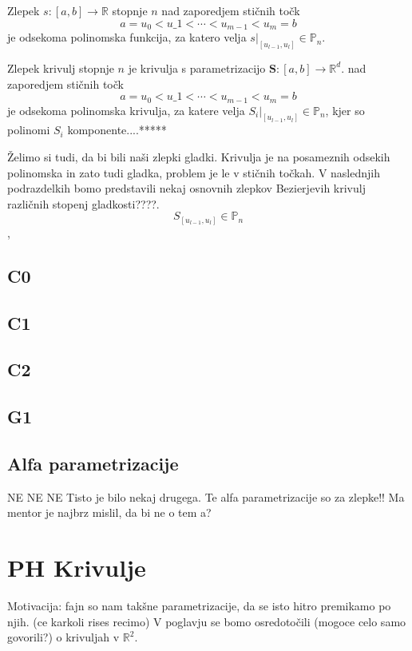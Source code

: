 \documentclass[isrm2, tisk]{fmfdelo}
\newcommand{\R}{\mathbb R}
\newcommand{\Pn}{\mathbb P_n}
\begin{document}
    \begin{definicija}
        Zlepek $s:[a,b]\to \R $  stopnje $n$ nad zaporedjem stičnih točk \[a=u_0 < u\_1 < \cdots < u_{m-1} < u_m = b\]
        je odsekoma polinomska funkcija, za katero velja $s|_{[u_{l-1},u_l]} \in \Pn$.
    \end{definicija}

    \begin{definicija}
        Zlepek krivulj stopnje $n$ je krivulja s parametrizacijo $\mathbf{S}:[a,b]\to \R^d$.
        nad zaporedjem stičnih točk \[a=u_0 < u\_1 < \cdots < u_{m-1} < u_m = b\]
        je odsekoma polinomska krivulja, za katere velja $S_i|_{[u_{l-1},u_l]} \in \Pn$, kjer so polinomi $S_i$ komponente....*****
    \end{definicija}

    Želimo si tudi, da bi bili naši zlepki gladki.
    Krivulja je na posameznih odsekih polinomska in zato tudi gladka, problem je le v stičnih točkah.
    V naslednjih podrazdelkih bomo predstavili nekaj osnovnih zlepkov Bezierjevih krivulj različnih stopenj gladkosti????.
    $$S_{[u_{l-1},u_l]} \in \Pn$$,

    \subsection{C0}

    \subsection{C1}

    \subsection{C2}

    \subsection{G1}

    \subsection{Alfa parametrizacije}
    NE
    NE
    NE
    Tisto je bilo nekaj drugega. Te alfa parametrizacije so za zlepke!! Ma mentor je najbrz mislil, da bi ne o tem a?


    \section{PH Krivulje}
    Motivacija: fajn so nam takšne parametrizacije, da se isto hitro premikamo po njih. (ce karkoli rises recimo)
    V poglavju se bomo osredotočili (mogoce celo samo govorili?) o krivuljah v $\R^2$.
\end{document}
